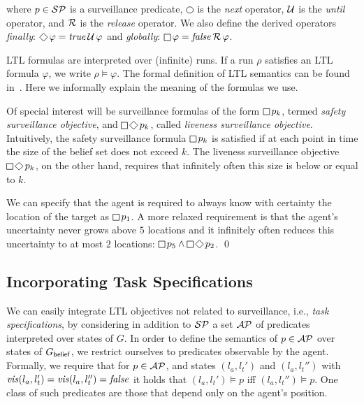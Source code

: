 where $p \in \mathcal{SP}$ is a surveillance predicate, $\LTLnext$ is the \emph{next} operator, $\operatorname{\mathcal{U}}$ is the \emph{until} operator, and $\operatorname{\mathcal{R}}$ is the \emph{release} operator. We also define the derived operators 
\emph{finally}: $\LTLfinally \varphi = \true \LTLuntil \varphi$ and 
\emph{globally}: $\LTLglobally \varphi = \false \LTLrelease \varphi$.

LTL formulas are interpreted over (infinite) runs. If a run $\rho$ satisfies an LTL formula $\varphi$, we write $\rho \models \varphi$. The formal definition of LTL semantics can be found in~\cite{BaierKatoen08}. Here we informally explain the meaning of the formulas we use.

Of special interest will be surveillance formulas of the form $\LTLglobally p_k$, termed \emph{safety surveillance objective}, and $\LTLglobally\LTLfinally p_k$, called \emph{liveness surveillance objective}.
Intuitively, the safety surveillance formula $\LTLglobally p_k$ is satisfied if at each point in time the size of the belief set does not exceed $k$. The liveness surveillance objective $\LTLglobally\LTLfinally p_k$, on the other hand, requires that infinitely often this size is below or equal to $k$.

\begin{example}
We can specify that the agent is required to always know with certainty the location of the target as
$\LTLglobally p_1$.
A more relaxed requirement is that the agent's uncertainty never grows above $5$ locations and it infinitely often reduces this uncertainty to at most $2$ locations: $\LTLglobally p_5 \wedge \LTLglobally\LTLfinally p_2$.
\qed
\end{example}


\subsection{Incorporating Task Specifications}
We can easily integrate LTL objectives not related to surveillance, i.e., \emph{task specifications}, by considering in addition to $\mathcal{SP}$ a set $\mathcal{AP}$ of predicates interpreted over states of $G$. In order to define the semantics of $p \in \mathcal{AP}$ over states of $G_{\mathsf{belief}}$, we restrict ourselves to predicates observable by the agent. 
Formally, we require that for $p \in \mathcal{AP}$, and states $(l_a,l_t')$ and $(l_a,l_t'')$ with $\mathit{vis}(l_a,l_t')=\mathit{vis}(l_a,l_t'')=\mathit{false}$ it holds that $(l_a,l_t') \models p$ iff $(l_a,l_t'') \models p$. One class of such predicates are those that depend only on the agent's position.

